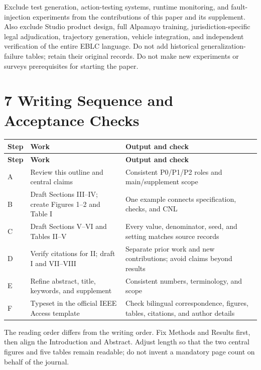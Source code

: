 \documentclass[11pt,a4paper]{article}
\begin{document}
Exclude test generation, action-testing systems, runtime monitoring, and fault-injection experiments from the contributions of this paper and its supplement. Also exclude Studio product design, full Alpamayo training, jurisdiction-specific legal adjudication, trajectory generation, vehicle integration, and independent verification of the entire EBLC language. Do not add historical generalization-failure tables; retain their original records. Do not make new experiments or surveys prerequisites for starting the paper.\par

\section*{7 Writing Sequence and Acceptance Checks}

\begingroup\small
\begin{longtable}{@{}>{\raggedright\arraybackslash}p{}>{\raggedright\arraybackslash}p{}>{\raggedright\arraybackslash}p{}@{}}
\toprule
\textbf{Step} & \textbf{Work} & \textbf{Output and check} \\
\midrule\endfirsthead
\toprule
\textbf{Step} & \textbf{Work} & \textbf{Output and check} \\
\midrule\endhead
\bottomrule\endfoot
A & Review this outline and central claims & Consistent P0/P1/P2 roles and main/supplement scope \\
B & Draft Sections III–IV; create Figures 1–2 and Table I & One example connects specification, checks, and CNL \\
C & Draft Sections V–VI and Tables II–V & Every value, denominator, seed, and setting matches source records \\
D & Verify citations for II; draft I and VII–VIII & Separate prior work and new contributions; avoid claims beyond results \\
E & Refine abstract, title, keywords, and supplement & Consistent numbers, terminology, and scope \\
F & Typeset in the official IEEE Access template & Check bilingual correspondence, figures, tables, citations, and author details \\
\end{longtable}
\endgroup

The reading order differs from the writing order. Fix Methods and Results first, then align the Introduction and Abstract. Adjust length so that the two central figures and five tables remain readable; do not invent a mandatory page count on behalf of the journal.\par
\end{document}
